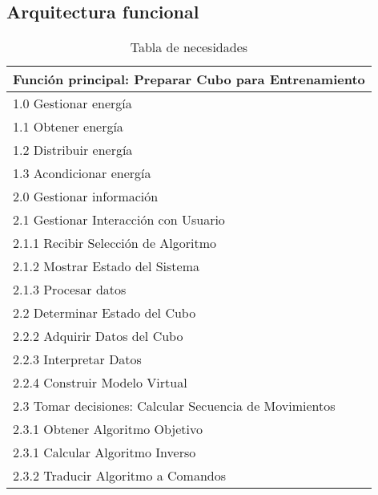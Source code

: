 \subsection{Arquitectura funcional}

\renewcommand{\arraystretch}{0.7} %
\begin{table}[h]
	\centering
	\caption{Tabla de necesidades}
	\begin{tabular}{l}
		\toprule
\textbf{Función principal: Preparar Cubo para Entrenamiento} \\ \hline
1.0 \; Gestionar energía \\ 
\hspace{0.5cm} 1.1 \; Obtener energía \\
\hspace{0.5cm} 1.2 \; Distribuir energía \\
\hspace{0.5cm} 1.3 \; Acondicionar energía \\ \hline
2.0 \; Gestionar información \\
\hspace{0.5cm} 2.1 \; Gestionar Interacción con Usuario\\
\hspace{1cm} 2.1.1 \; Recibir Selección de Algoritmo \\
\hspace{1cm} 2.1.2 \; Mostrar Estado del Sistema \\
\hspace{1cm} 2.1.3 \; Procesar datos \\
\hspace{0.5cm} 2.2 \; Determinar Estado del Cubo \\
\hspace{1cm} 2.2.2 \; Adquirir Datos del Cubo \\
\hspace{1cm} 2.2.3 \; Interpretar Datos \\
\hspace{1cm} 2.2.4 \; Construir Modelo Virtual \\
\hspace{0.5cm} 2.3 \; Tomar decisiones: Calcular Secuencia de Movimientos \\
\hspace{1cm} 2.3.1 \; Obtener Algoritmo Objetivo \\
\hspace{1cm} 2.3.1 \; Calcular Algoritmo Inverso \\
\hspace{1cm} 2.3.2 \; Traducir Algoritmo a Comandos \\ \hline

\end{tabular}
\end{table}
